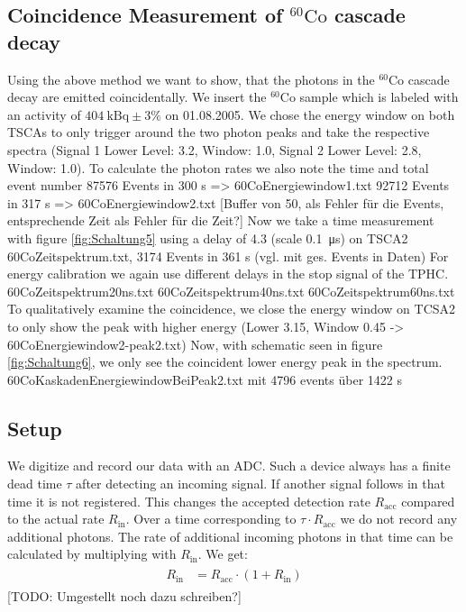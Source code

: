 \subsection{Coincidence Measurement of $^{60}\text{Co}$ cascade decay}
%
Using the above method we want to show, that the photons in the $^{60}\text{Co}$ cascade decay are emitted coincidentally. 
We insert the $^{60}\text{Co}$ sample which is labeled with an activity of $\SI{404}{\kilo\becquerel} \pm 3\%$ on 01.08.2005.
%
We chose the energy window on both TSCAs to only trigger around the two photon peaks and take the respective spectra (Signal 1 Lower Level: 3.2, Window: 1.0, Signal 2 Lower Level: 2.8, Window: 1.0).
To calculate the photon rates we also note the time and total event number
87576 Events in 300 s => 60CoEnergiewindow1.txt
92712 Events in 317 s => 60CoEnergiewindow2.txt
[Buffer von 50, als Fehler für die Events, entsprechende Zeit als Fehler für die Zeit?]
%
Now we take a time measurement with figure \ref{fig:Schaltung5} using a delay of 4.3 (scale \SI{0.1}{\micro\second}) on TSCA2
60CoZeitspektrum.txt, 3174 Events in 361 s (vgl. mit ges. Events in Daten)
%
For energy calibration we again use different delays in the stop signal of the TPHC.
60CoZeitspektrum20ns.txt
60CoZeitspektrum40ns.txt
60CoZeitspektrum60ns.txt
%
To qualitatively examine the coincidence, we close the energy window on TCSA2 to only show the peak with higher energy (Lower 3.15, Window 0.45 -> 60CoEnergiewindow2-peak2.txt)
%
Now, with schematic seen in figure \ref{fig:Schaltung6}, we only see the coincident lower energy peak in the spectrum.
60CoKaskadenEnergiewindowBeiPeak2.txt mit 4796 events über 1422 s
%
\subsection{Setup}
%
We digitize and record our data with an ADC.
Such a device always has a finite dead time $\tau$ after detecting an incoming signal.
If another signal follows in that time it is not registered.
This changes the accepted detection rate $R_{\text{acc}}$ compared to the actual rate $R_{\text{in}}$.
Over a time corresponding to $\tau \cdot R_{\text{acc}}$ we do not record any additional photons.
The rate of additional incoming photons in that time can be calculated by multiplying with $R_{\text{in}}$.
We get:
\begin{align}
    \label{eq:}
    \begin{split}
        R_{\text{in}} &= R_{\text{acc}} \cdot (1 + R_{\text{in}} )
    \end{split}
\end{align}
[TODO: Umgestellt noch dazu schreiben?]
%
